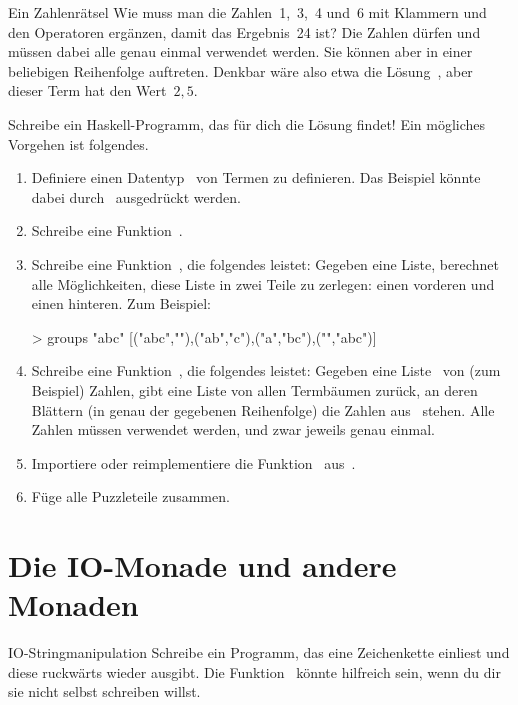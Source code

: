 \documentclass{uebblatt}
\begin{document}
\begin{aufgabe}{Ein Zahlenrätsel}
Wie muss man die Zahlen~1,~3,~4 und~6 mit Klammern und den Operatoren
\haskellinline{+ * - /} ergänzen, damit das Ergebnis~24 ist? Die Zahlen dürfen
und müssen dabei alle genau einmal verwendet werden. Sie können aber in einer
beliebigen Reihenfolge auftreten. Denkbar wäre also etwa die
Lösung~, aber dieser Term hat den Wert~$2{,}5$.

Schreibe ein Haskell-Programm, das für dich die Lösung findet! Ein mögliches
Vorgehen ist folgendes.

\begin{enumerate}
\item Definiere einen Datentyp~ von Termen zu definieren.
Das Beispiel könnte dabei durch~ ausgedrückt werden.
\item Schreibe eine Funktion~.
\item Schreibe eine Funktion~, die
folgendes leistet: Gegeben eine Liste, berechnet alle Möglichkeiten, diese Liste in zwei
Teile zu zerlegen: einen vorderen und einen hinteren. Zum Beispiel:
\begin{haskellcode}
> groups "abc"
[("abc",""),("ab","c"),("a","bc"),("","abc")]
\end{haskellcode}
\item Schreibe eine Funktion~, die
folgendes leistet: Gegeben eine Liste~ von (zum Beispiel)
Zahlen, gibt eine Liste von allen Termbäumen zurück, an deren Blättern (in
genau der gegebenen Reihenfolge) die Zahlen aus~ stehen. Alle Zahlen
müssen verwendet werden, und zwar jeweils genau einmal.
\item Importiere oder reimplementiere die Funktion~ aus~.
\item Füge alle Puzzleteile zusammen.
\end{enumerate}
\end{aufgabe}


\section{Die IO-Monade und andere Monaden}

\begin{aufgabe}{IO-Stringmanipulation}
Schreibe ein Programm, das eine Zeichenkette einliest und diese ruckwärts wieder ausgibt. Die Funktion~ könnte hilfreich sein, wenn du dir sie nicht selbst schreiben willst.
\end{aufgabe}
\end{document}
